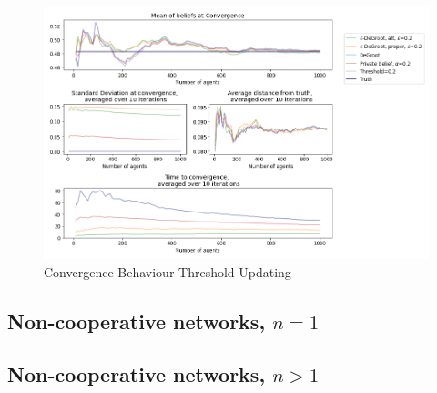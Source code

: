 \documentclass{article}
\begin{document}
\begin{center}
    \begin{figure}[!htbp]
        \centering
        \includegraphics[width=1.2\textwidth]{ThesisKI/Images/WisdomCompare0.png}
        \caption{Convergence Behaviour Threshold Updating}
        \label{coop:threshold}
    \end{figure}
\end{center}

\subsection{Non-cooperative networks, $n=1$}

\subsection{Non-cooperative networks, $n > 1$}
\end{document}
